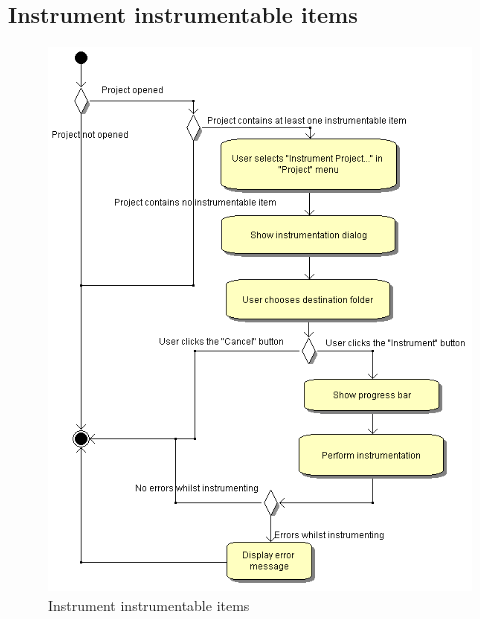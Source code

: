 \subsection{Instrument instrumentable items}
\begin{figure}[htb]
 \centering
 \includegraphics[height=0.7\textheight]{images/Activities/insturment_instrumentable_items.png}
 \caption{Instrument instrumentable items}
 \label{ac_fg:instrument_items}
\end{figure}

\clearpage
